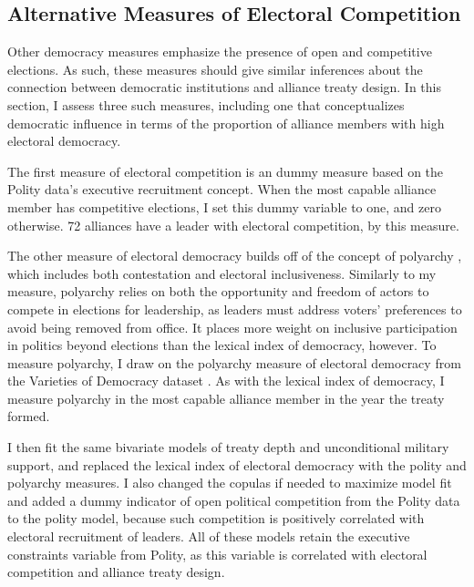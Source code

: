 \documentclass[12pt]{article}
\begin{document}
\subsection{Alternative Measures of Electoral Competition}


Other democracy measures emphasize the presence of open and competitive elections. 
As such, these measures should give similar inferences about the connection between democratic institutions and alliance treaty design. 
In this section, I assess three such measures, including one that conceptualizes democratic influence in terms of the proportion of alliance members with high electoral democracy. 


The first measure of electoral competition is an dummy measure based on the Polity data's executive recruitment concept.  
When the most capable alliance member has competitive elections, I set this dummy variable to one, and zero otherwise. 
72 alliances have a leader with electoral competition, by this measure. 


The other measure of electoral democracy builds off of the concept of polyarchy \citep{Dahl1971}, which includes both contestation and electoral inclusiveness. 
Similarly to my measure, polyarchy relies on both the opportunity and freedom of actors to compete in elections for leadership, as leaders must address voters' preferences to avoid being removed from office. 
It places more weight on inclusive participation in politics beyond elections than the lexical index of democracy, however. 
To measure polyarchy, I draw on the polyarchy measure of electoral democracy from the Varieties of Democracy dataset \citep{Teorelletal2016}.
As with the lexical index of democracy, I measure polyarchy in the most capable alliance member in the year the treaty formed.

 
I then fit the same bivariate models of treaty depth and unconditional military support, and replaced the lexical index of electoral democracy with the polity and polyarchy measures.
I also changed the copulas if needed to maximize model fit and added a dummy indicator of open political competition from the Polity data to the polity model, because such competition is positively correlated with electoral recruitment of leaders. 
All of these models retain the executive constraints variable from Polity, as this variable is correlated with electoral 
competition and alliance treaty design. 
\end{document}
